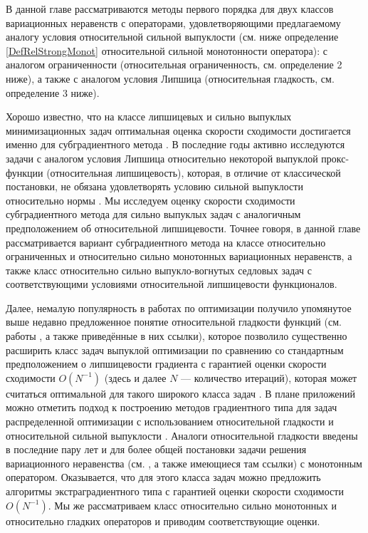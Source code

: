 В данной главе рассматриваются методы первого порядка для двух классов вариационных неравенств с операторами, удовлетворяющими предлагаемому аналогу условия относительной сильной выпуклости (см. ниже определение  \ref{DefRelStrongMonot} относительной сильной монотонности оператора): с аналогом ограниченности (относительная ограниченность, см. определение 2 ниже), а также с аналогом условия Липшица (относительная гладкость, см. определение 3 ниже).

Хорошо известно, что на классе липшицевых и сильно выпуклых минимизационных задач оптимальная оценка скорости сходимости достигается именно для субградиентного метода \cite{Simon_Julien_Bach_2012}. В последние годы активно исследуются задачи с аналогом условия Липшица относительно некоторой выпуклой прокс-функции (относительная липшицевость), которая, в отличие от классической постановки, не обязана удовлетворять условию сильной выпуклости относительно нормы \cite{AdaMirr_2021,Lu_2018,Zhou_NIPS_2020}. Мы исследуем оценку скорости сходимости субградиентного метода для сильно выпуклых задач с аналогичным предположением об относительной липшицевости. Точнее говоря, в данной главе рассматривается вариант субградиентного метода на классе относительно ограниченных и относительно сильно монотонных вариационных неравенств, а также класс относительно сильно выпукло-вогнутых седловых задач с соответствующими условиями относительной липшицевости функционалов. 

Далее, немалую популярность в работах по оптимизации получило упомянутое выше недавно предложенное понятие относительной гладкости функций (см. работы \cite{Bauschke,Drag,Dragomir,Lu_Nesterov_2018}, а также приведённые в них ссылки), которое позволило существенно расширить класс задач выпуклой оптимизации по сравнению со стандартным предположением о липшицевости градиента с гарантией оценки скорости сходимости $O(N^{-1})$ (здесь и далее $N$ --- количество итераций), которая может считаться оптимальной для такого широкого класса задач \cite{Dragomir}. В плане приложений можно отметить подход к построению методов градиентного типа для задач распределенной оптимизации с использованием относительной гладкости и относительной сильной выпуклости \cite{Hendr}. Аналоги относительной гладкости введены в последние пару лет и для более общей постановки задачи решения вариационного неравенства (см. \cite{Inex}, а также имеющиеся там ссылки) с монотонным оператором. Оказывается, что для этого класса задач можно предложить алгоритмы экстраградиентного типа с гарантией оценки скорости сходимости $O(N^{-1})$. Мы же рассматриваем класс относительно сильно монотонных и относительно гладких операторов и приводим соответствующие оценки.

